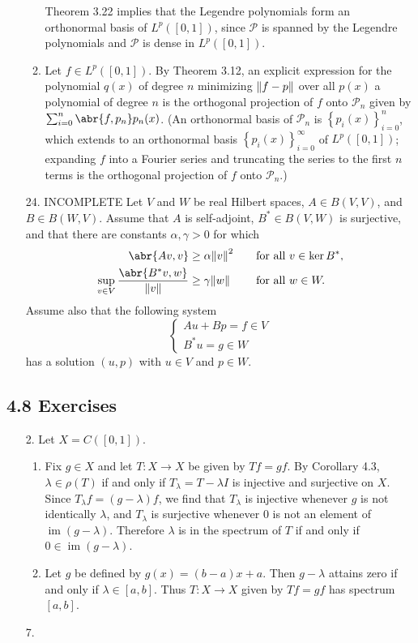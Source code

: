\documentclass[11pt,leqno]{article}
\theoremstyle{plain}
\theoremstyle{definition}
\numberwithin{equation}{section}
\numberwithin{lem}{section}
\newcommand{\cbr}[1]{\left\{#1\right\}}
\DeclareMathOperator{\im}{im}
\begin{document}
\begin{enumerate}
\begin{enumerate}
        Theorem 3.22 implies that the Legendre polynomials form an orthonormal basis of $L^p([0,1])$, since $\mathcal P$ is spanned by the Legendre polynomials and $\mathcal P$ is dense in $L^p([0,1])$.
        \item Let $f\in L^p([0,1])$. By Theorem 3.12, an explicit expression for the polynomial $q(x)$ of degree $n$ minimizing $\norm{f-p}$ over all $p(x)$ a polynomial of degree $n$ is the orthogonal projection of $f$ onto $\mathcal P_n$ given by $\sum_{i=0}^n \abr{f,p_n}p_n(x)$. (An orthonormal basis of $\mathcal P_n$ is $\cbr{p_i(x)}_{i=0}^n$, which extends to an orthonormal basis $\cbr{p_i(x)}_{i=0}^\infty$ of $L^p([0,1])$; expanding $f$ into a Fourier series and truncating the series to the first $n$ terms is the orthogonal projection of $f$ onto $\mathcal P_n$.)
    \end{enumerate}
    \item[24. INCOMPLETE] Let $V$ and $W$ be real Hilbert spaces, $A\in B(V,V)$, and $B\in B(W,V)$. Assume that $A$ is self-adjoint, $B^\ast\in B(V,W)$ is surjective, and that there are constants $\alpha,\gamma>0$ for which 
    \begin{alignat*}{2}
        \abr{Av,v}&\geq \alpha \norm{v}^2 &&\quad\text{for all }v\in \ker B^\ast,\\
        \sup_{v\in V}\frac{\abr{B^\ast v,w}}{\norm{v}}&\geq \gamma\norm{w} &&\quad\text{for all }w\in W.
    \end{alignat*}
    Assume also that the following system 
    \begin{equation*}
        \begin{cases*}
            Au+Bp = f\in V \\
            B^\ast u = g\in W
        \end{cases*}
    \end{equation*}
    has a solution $(u,p)$ with $u\in V$ and $p\in W$.
\end{enumerate}
\subsection*{4.8 Exercises}
\begin{enumerate}
    \item[2.] Let $X = C([0,1])$.
    \begin{enumerate}
        \item Fix $g\in X$ and let $T\colon X\to X$ be given by $Tf = gf$. By Corollary 4.3, $\lambda\in \rho(T)$ if and only if $T_\lambda = T-\lambda I$ is injective and surjective on $X$. Since $T_\lambda f= (g-\lambda)f$, we find that $T_\lambda$ is injective whenever $g$ is not identically $\lambda$, and $T_\lambda$ is surjective whenever $0$ is not an element of $\im (g-\lambda)$. Therefore $\lambda$ is in the spectrum of $T$ if and only if $0\in \im(g-\lambda)$.
        \item Let $g$ be defined by $g(x) = (b-a)x + a$. Then $g-\lambda$ attains zero if and only if $\lambda\in [a,b]$. Thus $T\colon X\to X$ given by $Tf = gf$ has spectrum $[a,b]$.
    \end{enumerate}
    \item[7.] 
\end{enumerate}
\end{document}
